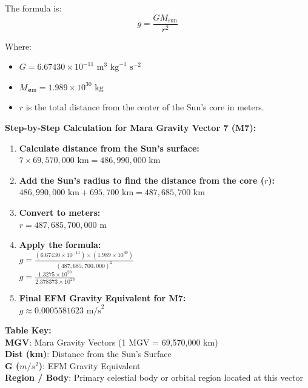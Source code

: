 \documentclass[11pt, a4paper]{article}
\begin{document}
  The formula is:
  \begin{equation*}
    g = \frac{G M_{\text{sun}}}{r^2}
  \end{equation*}

  Where:
  \begin{itemize}
    \item $G = 6.67430 \times 10^{-11} \text{ m}^3 \text{ kg}^{-1} \text{ s}^{-2}$
    \item $M_{\text{sun}} = 1.989 \times 10^{30} \text{ kg}$
    \item $r$ is the total distance from the center of the Sun's core in meters.
  \end{itemize}

  \vspace{1em}
  \textbf{Step-by-Step Calculation for Mara Gravity Vector 7 (M7):}  
  \begin{enumerate}
    \item \textbf{Calculate distance from the Sun's surface:} \\
    $7 \times 69,570,000 \text{ km} = 486,990,000 \text{ km}$
    \item \textbf{Add the Sun's radius to find the distance from the core ($r$):} \\
    $486,990,000 \text{ km} + 695,700 \text{ km} = 487,685,700 \text{ km}$
    \item \textbf{Convert to meters:} \\
    $r = 487,685,700,000 \text{ m}$
    \item \textbf{Apply the formula:} \\
    $g = \frac{(6.67430 \times 10^{-11}) \times (1.989 \times 10^{30})}{(487,685,700,000)^2}$ \\
    $g = \frac{1.3275 \times 10^{20}}{2.378373 \times 10^{23}}$
    \item \textbf{Final EFM Gravity Equivalent for M7:} \\
    $g \approx 0.0005581623 \text{ m/s}^2$
  \end{enumerate}

  \clearpage
  \noindent\textbf{Table Key:}\\
  \textbf{MGV}: Mara Gravity Vectors (1 MGV = 69,570,000 km)\\
  \textbf{Dist (km)}: Distance from the Sun's Surface\\
  \textbf{G ($m/s^2$)}: EFM Gravity Equivalent\\
  \textbf{Region / Body}: Primary celestial body or orbital region located at this vector
  \vspace{1em}
\end{document}
